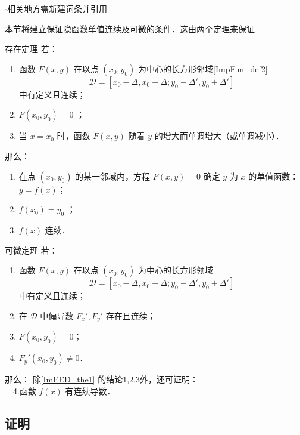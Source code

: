 
\begin{issues}
$\cdot$相关地方需新建词条并引用
\end{issues}

本节将建立保证隐函数单值连续及可微的条件．这由两个定理来保证
\begin{theorem}{存在定理}\label{ImFED_the1}
若：\begin{enumerate}
\item 函数 $F(x,y)$ 在以点 $(x_0,y_0)$ 为中心的长方形邻域\autoref{ImpFun_def2}~
\begin{equation}
\mathcal{D}=[x_0-\Delta,x_0+\Delta;y_0-\Delta',y_0+\Delta']
\end{equation}
中有定义且连续；
\item $F(x_0,y_0)=0$ ；
\item 当 $x=x_0$ 时，函数 $F(x,y)$ 随着 $y$ 的增大而单调增大（或单调减小）．
\end{enumerate}
那么：
\begin{enumerate}
\item 在点 $(x_0,y_0)$ 的某一邻域内，方程 $F(x,y)=0$ 确定 $y$ 为 $x$ 的单值函数： $y=f(x)$；
\item $f(x_0)=y_0$ ；
\item $f(x)$ 连续．
\end{enumerate}
\end{theorem}

\begin{theorem}{可微定理}
若：
\begin{enumerate}
\item 函数 $F(x,y)$ 在以点 $(x_0,y_0)$ 为中心的长方形领域
\begin{equation}
\mathcal{D}=[x_0-\Delta,x_0+\Delta;y_0-\Delta',y_0+\Delta']
\end{equation}
中有定义且连续；
\item 在 $\mathcal{D}$ 中偏导数 $F_x',F_y'$ 存在且连续；
\item $F(x_0,y_0)=0$；
\item $F_y'(x_0,y_0)\neq0$．
\end{enumerate}
那么：
除\autoref{ImFED_the1} 的结论1,2,3外，还可证明：\\
$\quad$4.函数 $f(x)$ 有连续导数．

\end{theorem}
\subsection{证明}

